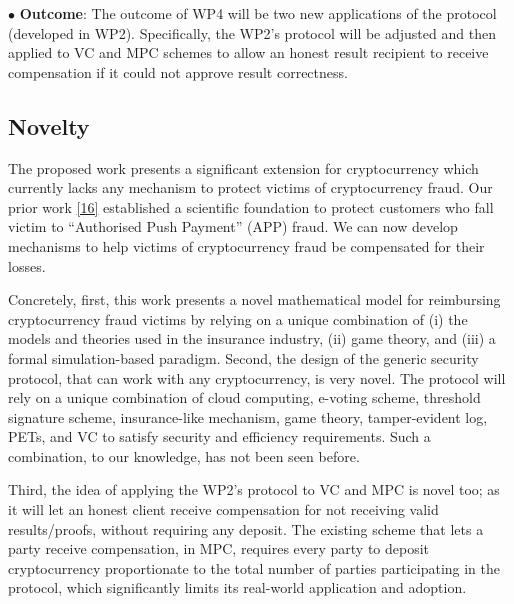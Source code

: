 
 
 
  \noindent$\bullet$\textbf{ Outcome}: The outcome of WP4 will be two new applications of the protocol (developed in WP2). Specifically, the WP2's protocol will be adjusted and then applied to VC and MPC schemes to allow an honest result recipient to receive compensation if it could not approve result correctness. 
 
 \subsection{Novelty}
 
 The proposed work presents a significant extension for cryptocurrency which currently lacks any mechanism to protect victims of cryptocurrency fraud.  Our prior work \href{https://eprint.iacr.org/2022/107.pdf}{[16]} established a scientific foundation to protect customers who fall victim to “Authorised Push Payment” (APP) fraud. We can now develop mechanisms to help victims of cryptocurrency fraud be compensated for their losses.
 
 
 
 

 Concretely, first, this work presents a novel mathematical model for reimbursing cryptocurrency fraud victims by relying on a unique combination of (i) the models and theories used in the insurance industry, (ii) game theory, and (iii) a formal simulation-based paradigm. Second, the design of the generic security protocol, that can work with any cryptocurrency, is very novel. The protocol will rely on a unique combination of cloud computing, e-voting scheme, threshold signature scheme, insurance-like mechanism, game theory, tamper-evident log, PETs, and VC to satisfy security and efficiency requirements. Such a combination, to our knowledge, has not been seen before. 
 


 Third, the idea of applying the WP2's protocol to VC and MPC is novel too; as it will let an honest client receive compensation for not receiving valid results/proofs, without requiring any deposit. The existing scheme that lets a party receive compensation,  in MPC, requires every party to deposit cryptocurrency proportionate to the total number of parties participating in the protocol, which significantly limits its real-world application and adoption.
 
